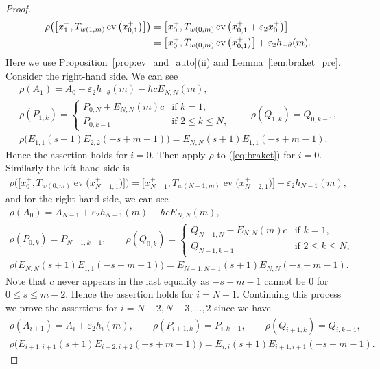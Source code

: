 \documentclass[10pt,a4paper]{amsart}
\theoremstyle{definition}
\numberwithin{equation}{section}
\DeclareMathOperator{\ev}{ev}
\newcommand{\ve}{\varepsilon}
\begin{document}
\begin{proof}
\begin{gather*}
\begin{split}&
 \rho\big(\big[x_1^+, T_{w(1,m)} \ev\big(x_{0,1}^+\big)\big]\big)=\big[x_0^+, T_{w(0,m)} \ev\big(x_{0,1}^++\ve_2 x_0^+\big)\big]\\
& \hphantom{\rho\big(\big[x_1^+, T_{w(1,m)} \ev\big(x_{0,1}^+\big)\big]\big)}{} = \big[x_0^+, T_{w(0,m)} \ev\big(x_{0,1}^+\big)\big] + \ve_2 h_{-\theta}(m).
\end{split}
\end{gather*}
Here we use Proposition~\ref{prop:ev_and_auto}(ii) and Lemma~\ref{lem:braket_pre}. Consider the right-hand side. We can see
\begin{gather*}
\rho(A_1) = A_0 + \ve_2 h_{-\theta}(m) - \hbar c E_{N,N}(m),\\
\rho(P_{1,k}) = \begin{cases}
P_{0,N} + E_{N,N}(m)c & \text{if $k=1$},\\
P_{0,k-1} & \text{if $2 \leq k \leq N$},
\end{cases}\qquad
\rho(Q_{1,k}) = Q_{0,k-1},\\
\rho\big(E_{1,1}(s+1)E_{2,2}(-s+m-1)\big) = E_{N,N}(s+1)E_{1,1}(-s+m-1).
\end{gather*}
Hence the assertion holds for $i=0$. Then apply $\rho$ to (\ref{eq:braket}) for $i=0$. Similarly the left-hand side is
\begin{gather*}
 \rho\big(\big[x_0^+, T_{w(0,m)} \ev\big(x_{N-1,1}^+\big)\big]\big)= \big[x_{N-1}^+, T_{w(N-1,m)} \ev\big(x_{N-2,1}^+\big)\big] + \ve_2 h_{N-1}(m),
\end{gather*}
and for the right-hand side, we can see
\begin{gather*}
\rho(A_0) = A_{N-1} + \ve_2 h_{N-1}(m) + \hbar c E_{N,N}(m),\\
\rho(P_{0,k}) = P_{N-1,k-1}, \qquad \rho(Q_{0,k}) = \begin{cases}
Q_{N-1,N} - E_{N,N}(m)c & \text{if $k=1$},\\
Q_{N-1,k-1} & \text{if $2 \leq k \leq N$},
\end{cases}\\
\rho\big(E_{N,N}(s+1)E_{1,1}(-s+m-1)\big) = E_{N-1,N-1}(s+1)E_{N,N}(-s+m-1).
\end{gather*}
Note that $c$ never appears in the last equality as $-s+m-1$ cannot be $0$ for $0 \leq s \leq m-2$. Hence the assertion holds for $i=N-1$. Continuing this process we prove the assertions for $i=N-2, N-3,\ldots,2$ since we have
\begin{gather*}
\rho(A_{i+1}) = A_{i} + \ve_2 h_{i}(m),\qquad \rho(P_{i+1,k}) = P_{i,k-1}, \qquad \rho(Q_{i+1,k}) =Q_{i,k-1},\\
\rho\big(E_{i+1,i+1}(s+1)E_{i+2,i+2}(-s+m-1)\big) = E_{i,i}(s+1)E_{i+1,i+1}(-s+m-1).\tag*{\qed}
\end{gather*}\renewcommand{\qed}{}
\end{proof}
\end{document}
